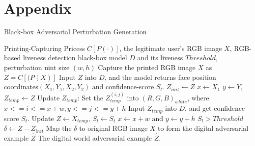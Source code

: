 \clearpage
\setcounter{table}{0}
\appendix


\section{Appendix}

\begin{algorithm}[h]
	\renewcommand{\algorithmicrequire}{\textbf{Input:}}
	\renewcommand{\algorithmicensure}{\textbf{Output:}}
	\caption{Black-box Adversarial Perturbation Generation}
	\label{alg1}
	\begin{algorithmic}[1]
		\REQUIRE Printing-Capturing Pricess $C[P(\cdot)]$, the legitimate user's RGB image $X$, RGB-based liveness detection black-box model $D$ and its liveness  $Threshold$, perturbation uint size $(w, h)$
		\STATE Capture the printed RGB image $X$ as $Z = C[(P(X)]$
		\STATE Input $Z$ into $D$, and the model returns  face position coordinates$(X_1,Y_1,X_2,Y_2)$ and confidence-score $S_l$. 
		\STATE $Z_{init} \leftarrow Z$
		\STATE $x \leftarrow X_1$
		\STATE $y \leftarrow Y_1$
		\REPEAT
		\STATE $Z_{temp} \leftarrow Z$
		\STATE Update $Z_{temp}$: Set the $Z_{temp}^{(i,j)}$ into $(R,G,B)_{white}$, where $x<=i<=x+w,y<=j<=y+h$
		\STATE Input $Z_{temp}$ into $D$, and get confidence score $S_t$. 
		\STATE Update $Z \leftarrow X_{temp}$, $S_l \leftarrow S_t$
		\ENDIF
		\STATE $x \leftarrow x+w$ and  $y \leftarrow y+h$
		\UNTIL $S_l>Threshold$
		\STATE $\delta \leftarrow Z-Z_{init}$
		\STATE Map the $\delta$ to original RGB image $X$ to form the digital adversarial example $\widehat{Z}$
		\ENSURE The digital world adversarial example $\widehat{Z}$.
	\end{algorithmic}  
\end{algorithm}

%				
%				
%			
%
